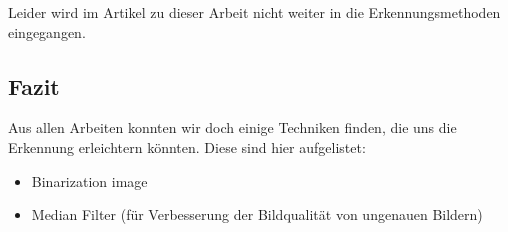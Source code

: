 Leider wird im Artikel zu dieser Arbeit nicht weiter in die Erkennungsmethoden eingegangen.

\subsection{Fazit}
Aus allen Arbeiten konnten wir doch einige Techniken finden, die uns die Erkennung erleichtern könnten. Diese sind hier aufgelistet:
\begin{itemize}
	\item Binarization image 
	\item Median Filter (für Verbesserung der Bildqualität von ungenauen Bildern)
\end{itemize}
